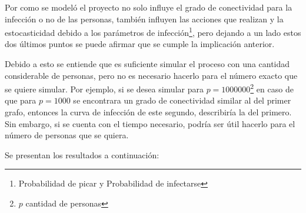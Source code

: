 Por como se modeló el proyecto no solo influye el grado de conectividad para la infección o no de las personas,
también influyen las acciones que realizan y la estocasticidad debido a los parámetros de 
infección\footnote{Probabilidad de picar y Probabilidad de infectarse}, pero dejando a un lado estos dos 
últimos puntos se puede afirmar que se cumple la implicación anterior.

Debido a esto se entiende que es suficiente simular el proceso con una cantidad considerable de personas,
pero no es necesario hacerlo para el número exacto que se quiere simular. Por ejemplo,
si se desea simular para $p = 1000000$\footnote{$p$ cantidad de personas} en caso de que para $p = 1000$ 
se encontrara un grado de conectividad similar al del primer grafo, entonces la curva de infección
de este segundo, describiría la del primero. Sin embargo, si se cuenta 
con el tiempo necesario, podría ser útil hacerlo para el número de personas que se quiera. 

Se presentan los resultados a continuación:
